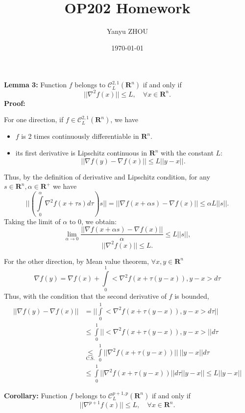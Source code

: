 \documentclass[12pt]{article}
\title{OP202 Homework}
\author{Yanyu ZHOU}
\date{\today}
\begin{document}
\maketitle
\section{}
\textbf{Lemma 3: }Function $f$ belongs to $\mathcal{C}^{2,1}_L(\mathbf{R}^n)$ if and only if
$$|| \nabla^2 f(x) ||\leq L, \quad \forall x\in\mathbf{R}^n.$$
\textbf{Proof:} 

For one direction, if $f \in \mathcal{C}^{2,1}_L(\mathbf{R}^n)$, we have
\begin{itemize}\label{C21}
    \item $f$ is 2 times continuously differentiable in $\mathbf{R}^n$.
    \item its first derivative is Lipschitz continuous in $\mathbf{R}^n$ with the constant $L$: $$||\nabla f(y)-\nabla f(x)||\leq L||y-x|| .$$
\end{itemize}
Thus, by the definition of derivative and Lipschitz condition, for any $s \in \mathbf{R}^n, \alpha \in \mathbf{R}^+$ we have
$$||(\int\limits_0^\alpha \nabla^2f(x+\tau s)d\tau )s|| = ||\nabla f(x+\alpha s)-\nabla f(x)|| \leq \alpha L||s||.$$
Taking the limit of $\alpha$ to 0, we obtain: 
$$\lim_{\alpha \rightarrow 0} \frac{||\nabla f(x+\alpha s)-\nabla f(x)||}{\alpha} \leq  L||s||,$$
$${\boxed{  || \nabla^2 f(x) ||\leq L}}.$$


For the other direction, by Mean value theorem, $\forall x,y \in \mathbf{R}^n$
$$\nabla f(y) =  \nabla f(x) + \int\limits_0^1 <\nabla^2f(x+ \tau (y-x)), y-x > d \tau $$
Thus, with the condition that the second derivative of $f$ is bounded, 
\begin{equation}
\begin{split}
||\nabla f(y)-\nabla f(x)|| &= ||\int\limits_0^1 <\nabla^2f(x+ \tau (y-x)), y-x > d \tau ||\\
    & \leq  \int\limits_0^1 ||<\nabla^2f(x+ \tau (y-x)), y-x > ||d \tau\\
    & \underset{\text{C.S.}}{\leq} \int\limits_0^1 ||\nabla^2f(x+ \tau (y-x)) ||\  ||y-x|| d \tau\\
    & \leq \int\limits_0^1 ||\nabla^2f(x+ \tau (y-x)) ||  d \tau||y-x|| \leq L||y-x|| 
\end{split}
\end{equation}

\textbf{Corollary: }Function $f$ belongs to $\mathcal{C}^{p+1,p}_L(\mathbf{R}^n)$ if and only if
$$|| \nabla^{p+1} f(x) ||\leq L, \quad \forall x\in\mathbf{R}^n.$$
\end{document}
